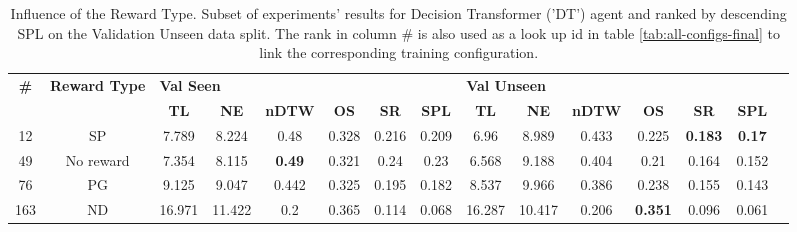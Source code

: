 \begin{table}
\centering
\caption{\label{tab:dt_reward_type}Influence of the Reward Type. Subset of experiments' results for Decision Transformer ('DT') agent and ranked by descending SPL on the Validation Unseen data split. The rank in column \# is also used as a look up id in table \ref{tab:all-configs-final} to link the corresponding training configuration.}
\begin{tabular}{@{\hskip3pt}c@{\hskip3pt}c@{\hskip3pt}c@{\hskip3pt}c@{\hskip3pt}c@{\hskip3pt}c@{\hskip3pt}c@{\hskip3pt}c@{\hskip3pt}c@{\hskip3pt}c@{\hskip3pt}c@{\hskip3pt}c@{\hskip3pt}c@{\hskip3pt}c@{\hskip3pt}c}
\toprule
\textbf{\#} & \textbf{Reward Type} & \multicolumn{6}{l}{\textbf{Val Seen}} & \multicolumn{6}{l}{\textbf{Val Unseen}} \\
 \textbf{~} &           \textbf{~} &       \textbf{TL} & \textbf{NE} &  \textbf{nDTW} & \textbf{OS} & \textbf{SR} & \textbf{SPL} &         \textbf{TL} & \textbf{NE} & \textbf{nDTW} &     \textbf{OS} &     \textbf{SR} &   \textbf{SPL} \\
\midrule
         12 &                   SP &             7.789 &       8.224 &           0.48 &       0.328 &       0.216 &        0.209 &                6.96 &       8.989 &         0.433 &           0.225 &  \textbf{0.183} &  \textbf{0.17} \\
         49 &            No reward &             7.354 &       8.115 &  \textbf{0.49} &       0.321 &        0.24 &         0.23 &               6.568 &       9.188 &         0.404 &            0.21 &           0.164 &          0.152 \\
         76 &                   PG &             9.125 &       9.047 &          0.442 &       0.325 &       0.195 &        0.182 &               8.537 &       9.966 &         0.386 &           0.238 &           0.155 &          0.143 \\
        163 &                   ND &            16.971 &      11.422 &            0.2 &       0.365 &       0.114 &        0.068 &              16.287 &      10.417 &         0.206 &  \textbf{0.351} &           0.096 &          0.061 \\
\bottomrule
\end{tabular}
\end{table}
